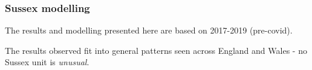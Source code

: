 \begin{frame}
\frametitle{Sussex modelling}


The results and modelling presented here are based on 2017-2019 (pre-covid).

\vspace{6mm}

The results observed fit into general patterns seen across England and Wales - no Sussex unit is \emph{unusual}.


\end{frame}